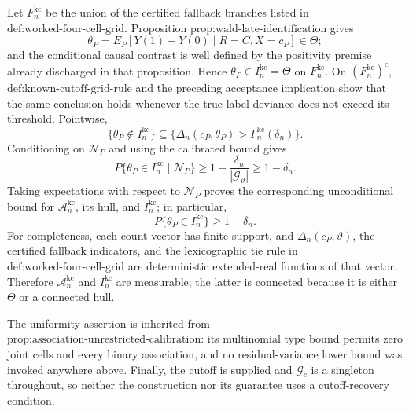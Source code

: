 Let \(F_n^{\mathrm{kc}}\) be the union of the certified fallback branches listed in \(\text{def:worked-four-cell-grid}\).  Proposition \(\text{prop:wald-late-identification}\) gives
\[
\theta_P=E_P\!\left[Y(1)-Y(0)\mid R=C,X=c_P\right]\in\Theta;
\]
and the conditional causal contrast is well defined by the positivity premise already discharged in that proposition.  Hence \(\theta_P\in I_n^{\mathrm{kc}}=\Theta\) on \(F_n^{\mathrm{kc}}\).  On \((F_n^{\mathrm{kc}})^c\), \(\text{def:known-cutoff-grid-rule}\) and the preceding acceptance implication show that the same conclusion holds whenever the true-label deviance does not exceed its threshold.  Pointwise,
\[
\{\theta_P\notin I_n^{\mathrm{kc}}\}
\subseteq
\{\Delta_n(c_P,\theta_P)>\Gamma_n^{\mathrm{kc}}(\delta_n)\}.
\]
Conditioning on \(\mathscr N_P\) and using the calibrated bound gives
\[
P\{\theta_P\in I_n^{\mathrm{kc}}\mid\mathscr N_P\}
\ge1-\frac{\delta_n}{|\mathcal G_\vartheta|}
\ge1-\delta_n.
\]
Taking expectations with respect to \(\mathscr N_P\) proves the corresponding unconditional bound for \(\mathcal A_n^{\mathrm{kc}}\), its hull, and \(I_n^{\mathrm{kc}}\); in particular,
\[
P\{\theta_P\in I_n^{\mathrm{kc}}\}\ge1-\delta_n.
\]
For completeness, each count vector has finite support, and \(\Delta_n(c_P,\vartheta)\), the certified fallback indicators, and the lexicographic tie rule in \(\text{def:worked-four-cell-grid}\) are deterministic extended-real functions of that vector.  Therefore \(\mathcal A_n^{\mathrm{kc}}\) and \(I_n^{\mathrm{kc}}\) are measurable; the latter is connected because it is either \(\Theta\) or a connected hull.

The uniformity assertion is inherited from \(\text{prop:association-unrestricted-calibration}\): its multinomial type bound permits zero joint cells and every binary association, and no residual-variance lower bound was invoked anywhere above.  Finally, the cutoff is supplied and \(\mathcal G_c\) is a singleton throughout, so neither the construction nor its guarantee uses a cutoff-recovery condition.
